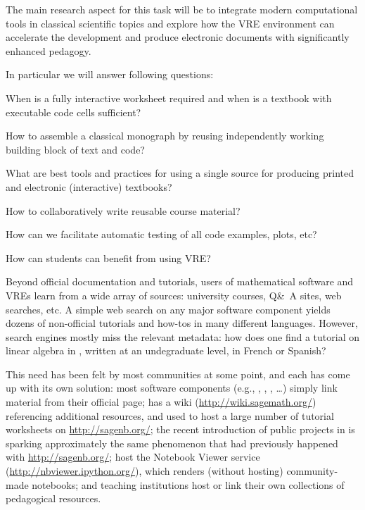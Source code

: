 \begin{workpackage}
\begin{tasklist}
\begin{task}[title=Demonstrator: Interactive books,
id=ibook,lead=US,PM=30]
The main research aspect for this task will be to integrate modern
computational tools in classical scientific topics and explore how
the VRE environment can accelerate the development and produce electronic
documents with significantly enhanced pedagogy.

In particular we will answer following questions:

\begin{compactitem}
\item When is a fully interactive worksheet required and when is
  a textbook with executable code cells sufficient?
\item How to assemble a classical monograph by reusing independently working
  building block of text and code?
\item What are best tools and practices for using a single source for
  producing printed and electronic (interactive) textbooks?
\item How to collaboratively write reusable course material?
\item How can we facilitate automatic testing of all code examples, plots, etc?
\item How can students can benefit from using VRE?
\end{compactitem}


\end{task}

\begin{task}[title=Demonstrator: Computational mathematics resources indexing service,
id=index-librorum-salvificorum,lead=UV,PM=2,partners={UB}] Beyond official documentation and
  tutorials, users of mathematical software and VREs learn from a wide
  array of sources: university courses, Q\&\ A sites, web searches,
  etc.  A simple web search on any major software component yields
  dozens of non-official tutorials and how-tos in many different
  languages. However, search engines mostly miss the relevant
  metadata: how does one find a tutorial on linear algebra in \PariGP,
  written at an undegraduate level, in French or Spanish?

This need has been felt by most communities at some point, and each
has come up with its own solution: most software components (e.g.,
\GAP, \PariGP, \Sage, \dots) simply link material from their official
page; \Sage has a wiki (\url{http://wiki.sagemath.org/}) referencing
additional resources, and used to host a large number of tutorial
worksheets on \url{http://sagenb.org/}; the recent introduction of
public projects in \SMC is sparking approximately the same phenomenon
that had previously happened with \url{http://sagenb.org/}; \IPython
host the Notebook Viewer service (\url{http://nbviewer.ipython.org/}),
which renders (without hosting) community-made notebooks; and teaching
institutions host or link their own collections of pedagogical
resources.


\end{task}
\end{tasklist}
\end{workpackage}
